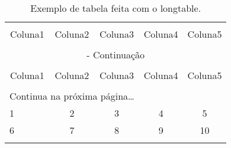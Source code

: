\begin{center}
\setcaptionmargin{1cm}
\scriptsize
\begin{longtable}{lcccc}
\caption[Resumo da legenda da tabela (aparece na lista de figuras)]{Exemplo de tabela feita com o longtable.}\\
\hline \hline \\[-2ex]
\multicolumn{1}{c}{Coluna1} &
\multicolumn{1}{c}{Coluna2} &
\multicolumn{1}{c}{Coluna3} &
\multicolumn{1}{c}{Coluna4} &
\multicolumn{1}{c}{Coluna5} 

\\[0.5ex] \hline
\\[-1.8ex]

\endfirsthead

\multicolumn{5}{c}{\footnotesize{{\slshape{{\tablename} \thetable{}}} - Continuação}}\\[0.5ex]

\hline \hline\\[-2ex]

\multicolumn{1}{c}{Coluna1} &
\multicolumn{1}{c}{Coluna2} &
\multicolumn{1}{c}{Coluna3} &
\multicolumn{1}{c}{Coluna4} &
\multicolumn{1}{c}{Coluna5} 

\\[0.5ex] \hline
\\[-1.8ex]

\endhead

\multicolumn{3}{l}{{\footnotesize{Continua na próxima página\ldots}}}\\
\endfoot
\hline

\endlastfoot

1 & 2 & 3 & 4 & 5 \\
6 & 7 & 8 & 9 & 10\\

\label{tabela_com_longtable}
\end{longtable}
\end{center}
